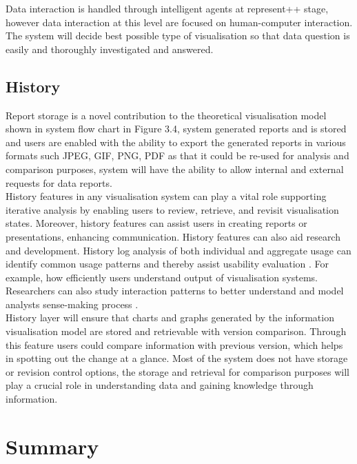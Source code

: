 Data interaction is handled through intelligent agents at represent++ stage, however data interaction at this level are focused on human-computer interaction. The system will decide best possible type of visualisation so that data question is easily and thoroughly investigated and answered. 

\subsection{History}

Report storage is a novel contribution to the theoretical visualisation model shown in system flow chart in Figure 3.4, system generated reports and is stored and users are enabled with the ability to export the generated reports in various formats such JPEG, GIF, PNG, PDF as that it could be re-used for analysis and comparison purposes, system will have the ability to allow internal and external requests for data reports.\\

History features in any visualisation system can play a vital role
supporting iterative analysis by enabling users to review, retrieve,
and revisit visualisation states. Moreover, history features can assist users in creating reports or presentations, enhancing communication. History features can also aid research and development. History log analysis of both individual and aggregate usage can
identify common usage patterns and thereby assist usability
evaluation \cite{heer2008graphical}. For example, how efficiently users understand output of visualisation systems. Researchers can also study interaction patterns to better understand and model analysts sense-making process \cite{jankun2007model}.\\

History layer will ensure that charts and graphs generated by the information visualisation model are stored and retrievable with version comparison. Through this feature users could compare information with previous version, which helps in spotting out the change at a glance. Most of the system does not have storage or revision control options, the storage and retrieval for comparison purposes will play a crucial role in understanding data and gaining knowledge through information.

\section{Summary}

